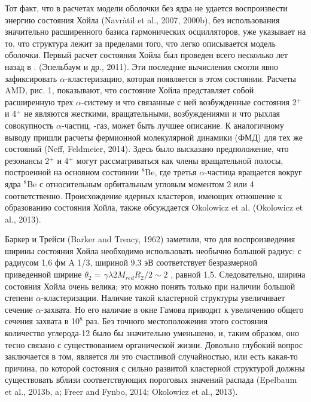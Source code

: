 \documentclass[fontsize=14pt]{scrreport}
\begin{document}
Тот факт, что в расчетах модели оболочки без ядра не удается воспроизвести энергию состояния Хойла (Navr\`{a}til et al., 2007, 2000b), без использования значительно расширенного базиса гармонических осцилляторов, уже указывает на то, что структура лежит за пределами того, что легко описывается модель оболочки. Первый расчет состояния Хойла был проведен всего несколько лет назад в \cite{4}. (Эпельбаум и др., 2011). Эти последние вычисления смогли явно зафиксировать $\alpha$-кластеризацию, которая появляется в этом состоянии. Расчеты AMD, рис. 1, показывают, что состояние Хойла представляет собой расширенную трех $\alpha$-систему и что связанные с ней возбужденные состояния 2$^{+}$ и 4$^{+}$ не являются жесткими, вращательными, возбуждениями и что рыхлая совокупность $\alpha$-частиц, -газ, может быть лучшее описание. К аналогичному выводу пришли расчеты фермионной молекулярной динамики (ФМД) для тех же состояний (Neff, Feldmeier, 2014). Здесь было высказано предположение, что резонансы 2$^{+}$ и 4$^{+}$ могут рассматриваться как члены вращательной полосы, построенной на основном состоянии $^{8}$Be, где третья $\alpha$-частица вращается вокруг ядра $^{8}$Be с относительным орбитальным угловым моментом 2 или 4 соответственно. Происхождение ядерных кластеров, имеющих отношение к образованию состояния Хойла, также обсуждается Okolowicz et al. (Okolowicz et al., 2013).

Баркер и Трейси (Barker and Treacy, 1962) заметили, что для воспроизведения ширины состояния Хойла необходимо использовать необычно большой радиус: с радиусом 1,6 фм A 1/3, шириной 9,3 эВ соответствует безразмерной приведенной ширине $\theta_{2}$ = $\gamma\lambda 2 M_{red}R_{2}/2\sim 2$ , равной 1,5. Следовательно, ширина состояния Хойла очень велика; это можно понять только при наличии большой степени $\alpha$-кластеризации. Наличие такой кластерной структуры увеличивает сечение $\alpha$-захвата. Но его наличие в окне Гамова приводит к увеличению общего сечения захвата в 10$^{8}$ раз. Без точного местоположения этого состояния количество углерода-12 было бы значительно уменьшено, и, таким образом, оно тесно связано с существованием органической жизни. Довольно глубокий вопрос заключается в том, является ли это счастливой случайностью, или есть какая-то причина, по которой состояния с сильно развитой кластерной структурой должны существовать вблизи соответствующих пороговых значений распада (Epelbaum et al., 2013b, a; Freer and Fynbo, 2014; Okolowicz et al., 2013).
\end{document}
